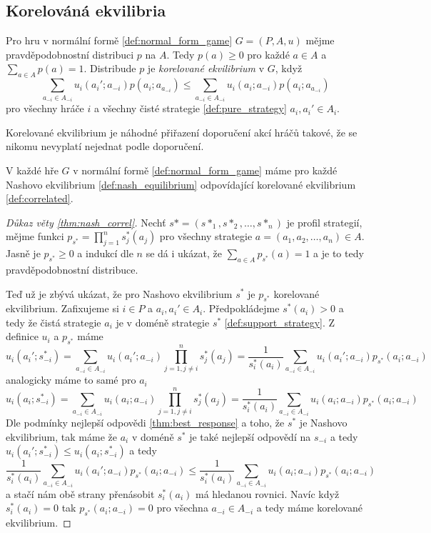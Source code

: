 \subsection{Korelováná ekvilibria}
\begin{definition}
\label{def:correlated}
Pro hru v normální formě \ref{def:normal_form_game} $G=(P,A,u)$ mějme pravděpodobnostní distribuci $p$ na $A$. 
Tedy $p(a) \geq 0$ pro každé $a \in A$ a $\sum_{a\in A} p(a) = 1$. 
Distribude $p$ je \textit{korelované ekvilibrium} v $G$, když 
$$ 
\sum_{a_{-i} \in A_{-i}} u_i(a_i'; a_{-i}) p(a_i; a_{a_{-i}}) \leq \sum_{a_{-i} \in A_{-i}} u_i(a_i; a_{-i}) p(a_i; a_{a_{-i}})  
$$
pro všechny hráče $i$ a všechny čisté strategie \ref{def:pure_strategy} $a_i, a_i' \in A_i$.
\end{definition}
Korelované ekvilibrium je náhodné přiřazení doporučení akcí hráčů takové, že se nikomu nevyplatí nejednat podle doporučení. 

\begin{theorem}
\label{thm:nash_correl}
    V každé hře $G$ v normální formě \ref{def:normal_form_game} máme pro každé Nashovo ekvilibrium \ref{def:nash_equilibrium} odpovídající korelované ekvilibrium \ref{def:correlated}. 
\end{theorem}
\begin{proof}[Důkaz věty \ref{thm:nash_correl}]
    Nechť $s* = (s*_1, s*_2, \dots, s*_n)$ je profil strategií, mějme funkci $p_{s^*} = \prod^n_{j=1} s_j^* (a_j)$ pro všechny strategie $a = (a_1, a_2, \dots, a_n) \in A$. 
    Jasně je $p_{s^*} \geq 0$ a indukcí dle $n$ se dá i ukázat, že $\sum_{a\in A} p_{s^*}(a) =1$ a je to tedy pravděpodobnostní distribuce. 

    Teď už je zbývá ukázat, že pro Nashovo ekvilibrium $s^*$ je $p_{s^*}$ korelované ekvilibrium. 
    Zafixujeme si $i \in P$ a $a_i, a_i' \in A_i$. Předpokládejme $s^*(a_i) > 0$ a tedy že čistá strategie $a_i$ je v doméně strategie $s^*$ \ref{def:support_strategy}. 
    Z definice $u_i$ a $p_{s^*}$ máme 
    $$ 
    u_i(a_i'; s^*_{-i}) = \sum_{a_{-i} \in A_{-i}} u_i(a_i'; a_{-i}) \prod_{j=1, j\neq i}^n s^*_j(a_j) = \frac{1}{s^*_i(a_i)} \sum_{a_{-i} \in A_{-i}} u_i(a_i'; a_{-i}) p_{s^*} (a_i; a_{-i})
    $$
    analogicky máme to samé pro $a_i$
    $$ 
    u_i(a_i; s^*_{-i}) = \sum_{a_{-i} \in A_{-i}} u_i(a_i; a_{-i}) \prod_{j=1, j\neq i}^n s^*_j(a_j) = \frac{1}{s^*_i(a_i)} \sum_{a_{-i} \in A_{-i}} u_i(a_i; a_{-i}) p_{s^*} (a_i; a_{-i})
    $$
    Dle podmínky nejlepší odpovědi \ref{thm:best_response} a toho, že $s^*$ je Nashovo ekvilibrium, tak máme že $a_i$ v doméně $s^*$ je také nejlepší odpovědí na $s_{-i}$ a tedy $u_i(a_i'; s^*_{-i}) \leq u_i(a_i; s^*_{-i})$ a tedy 
    $$ 
    \frac{1}{s^*_i(a_i)} \sum_{a_{-i} \in A_{-i}} u_i(a_i'; a_{-i}) p_{s^*} (a_i; a_{-i}) \leq \frac{1}{s^*_i(a_i)} \sum_{a_{-i} \in A_{-i}} u_i(a_i; a_{-i}) p_{s^*} (a_i; a_{-i})
    $$ 
    a stačí nám obě strany přenásobit $s^*_i(a_i)$ má hledanou rovnici. 
    Navíc když $s^*_i(a_i) = 0$ tak $p_{s^*}(a_i; a_{-i}) = 0$ pro všechna $a_{-i} \in A_{-i}$ a tedy máme korelované ekvilibrium.
\end{proof}

